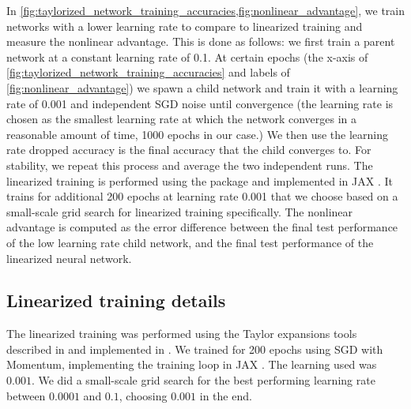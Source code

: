 \documentclass{article}
\begin{document}
In \cref{fig:taylorized_network_training_accuracies,fig:nonlinear_advantage}, we train networks with a lower learning rate to compare to linearized training and measure the nonlinear advantage. This is done as follows: we first train a parent network at a constant learning rate of 0.1. At certain epochs (the x-axis of \cref{fig:taylorized_network_training_accuracies} and labels of \cref{fig:nonlinear_advantage}) we spawn a child network and train it with a learning rate of 0.001 and independent SGD noise until convergence (the learning rate is chosen as the smallest learning rate at which the network converges in a reasonable amount of time, 1000 epochs in our case.) We then use the learning rate dropped accuracy is the final accuracy that the child converges to. For stability, we repeat this process and average the two independent runs. The linearized training is performed using the \citet{neuraltangents2020} package and implemented in JAX \citep{jax2018github}. It trains for additional 200 epochs at learning rate 0.001 that we choose based on a small-scale grid search for linearized training specifically. The nonlinear advantage is computed as the error difference between the final test performance of the low learning rate child network, and the final test performance of the linearized neural network.


\subsection{Linearized training details}
The linearized training was performed using the Taylor expansions tools described in \citet{novak2019neural} and implemented in \citet{neuraltangents2020}. We trained for 200 epochs using SGD with Momentum, implementing the training loop in JAX \citep{jax2018github}. The learning used was $0.001$. We did a small-scale grid search for the best performing learning rate between $0.0001$ and $0.1$, choosing $0.001$ in the end.
\end{document}
